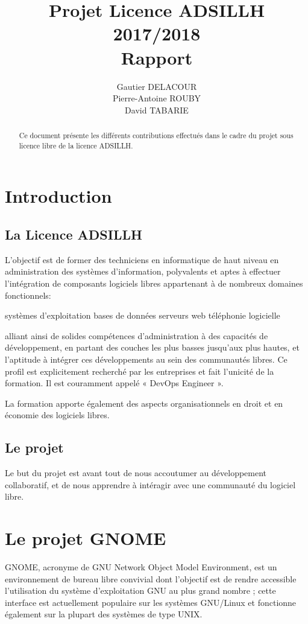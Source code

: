 \documentclass[12pt]{report}
\title{Projet Licence ADSILLH 2017/2018\\Rapport}
\author{Gautier DELACOUR\\Pierre-Antoine ROUBY\\David TABARIE} %
\begin{document}
\maketitle

\begin{abstract}
Ce document présente les différents contributions effectués dans le cadre du projet sous licence libre de la licence ADSILLH.

\end{abstract}

\tableofcontents

\chapter{Introduction}

\section{La Licence ADSILLH}
L'objectif est de former des techniciens en informatique de haut
niveau en administration des systèmes d'information, polyvalents et
aptes à effectuer l'intégration de composants logiciels libres
appartenant à de nombreux domaines fonctionnels:

systèmes d'exploitation
bases de données
serveurs web
téléphonie logicielle

alliant ainsi de solides compétences d'administration à des capacités
de développement, en partant des couches les plus basses jusqu'aux
plus hautes, et l'aptitude à intégrer ces développements au sein des
communautés libres. Ce profil est explicitement recherché par les
entreprises et fait l'unicité de la formation. Il est couramment
appelé « DevOps Engineer ».

La formation apporte également des aspects organisationnels en droit
et en économie des logiciels libres.

\section{Le projet}
Le but du projet est avant tout de nous accoutumer au développement
collaboratif, et de nous apprendre à intéragir avec une communauté
du logiciel libre.

\chapter{Le projet GNOME}
GNOME, acronyme de GNU Network Object Model Environment, est un
environnement de bureau libre convivial dont l'objectif est de rendre
accessible l'utilisation du système d'exploitation GNU au plus grand
nombre ; cette interface est actuellement populaire sur les systèmes
GNU/Linux et fonctionne également sur la plupart des systèmes de type
UNIX.
\end{document}
